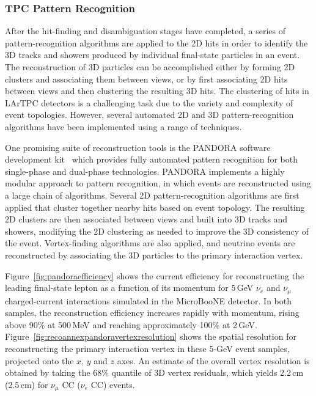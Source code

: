\subsubsection{TPC Pattern Recognition}

After the hit-finding and disambiguation stages have completed, a series of 
pattern-recognition algorithms are applied to the 2D hits in order to identify 
the 3D tracks and showers produced by individual final-state particles in an event.
The reconstruction of 3D particles can be accomplished either by forming 2D clusters
and associating them between views, or by first associating 2D hits between views
and then clustering the resulting 3D hits. 
The clustering of hits in LArTPC detectors is a challenging task
due to the variety and complexity of event topologies.
However, several automated 2D and 3D pattern-recognition algorithms have been 
implemented using a range of techniques.

One promising suite of reconstruction tools is the 
PANDORA software development kit~\cite{Marshall:2013bda,Marshall:2012hh}
which provides fully automated pattern recognition for both single-phase 
and dual-phase technologies. 
PANDORA implements a highly modular approach to pattern recognition,
in which events are reconstructed using a large chain of algorithms. 
Several 2D pattern-recognition algorithms are first applied
that cluster together nearby hits based on event topology.
The resulting 2D clusters are then associated between views
and built into 3D tracks and showers, modifying the 2D clustering 
as needed to improve the 3D consistency of the event. 
Vertex-finding algorithms are also applied,
and neutrino events are reconstructed by associating the 
3D particles to the primary interaction vertex.

Figure~\ref{fig:pandoraefficiency} shows the current efficiency for reconstructing
the leading final-state lepton as a function of its momentum
for 5\,GeV $\nu_{e}$ and $\nu_{\mu}$ charged-current interactions
simulated in the MicroBooNE detector.
In both samples, the reconstruction efficiency increases rapidly with momentum,
rising above 90\% at 500\,MeV and reaching approximately 100\% at 2\,GeV.
Figure~\ref{fig:recoannexpandoravertexresolution} shows the spatial resolution for
reconstructing the primary interaction vertex in these 5-GeV event samples,
projected onto the $x$, $y$ and $z$ axes. An estimate of the overall vertex 
resolution is obtained by taking the 68\% quantile of 3D vertex residuals, 
which yields 2.2\,cm (2.5\,cm) for $\nu_{\mu}$ CC ($\nu_{e}$ CC) events.

